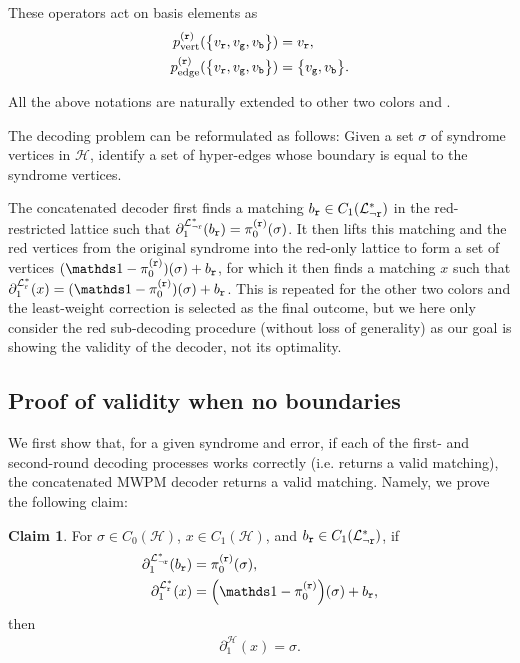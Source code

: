 \documentclass[a4paper,twocolumn,11pt,accepted=2025-01-21]{quantumarticle}
\theoremstyle{definition}
\theoremstyle{definition}
\theoremstyle{definition}
\newtheorem{claim}{Claim}
\begin{document}
These operators act on basis elements as
\begin{align*}
    p_{\mathrm{vert}}^{(\texttt{r})}(\qty{v_{\texttt{r}},v_{\texttt{g}},v_{\texttt{b}}}) &= v_{\texttt{r}}, \\
    p_{\mathrm{edge}}^{(\texttt{r})}(\qty{v_{\texttt{r}},v_{\texttt{g}},v_{\texttt{b}}}) &= \qty{v_{\texttt{g}},v_{\texttt{b}}}.
\end{align*}

All the above notations are naturally extended to other two colors \gbs and \bbs.

The decoding problem can be reformulated as follows: Given a set $\sigma$ of syndrome vertices in $\mathcal{H}$, identify a set of hyper-edges whose boundary is equal to the syndrome vertices.

The concatenated decoder first finds a matching $b_{\texttt{r}} \in C_1(\mathcal{L}_{\neg \texttt{r}}^*)$ in the red-restricted lattice such that $\partial_1^{\mathcal{L}^*_{\neg \texttt{r}}} (b_{\texttt{r}}) = \pi^{(\texttt{r})}_0(\sigma)$.
It then lifts this matching and the red vertices from the original syndrome into the red-only lattice to form a set of vertices $(\identity - \pi_0^{(\rbs)})(\sigma) + b_\rbs$, for which it then finds a matching $x$ such that $\partial_1^{\LatticeMono{\rbs}}(x) = (\identity - \pi_0^{(\rbs)})(\sigma) + b_\rbs$. This is repeated for the other two colors and the least-weight correction is selected as the final outcome, but we here only consider the red sub-decoding procedure (without loss of generality) as our goal is showing the validity of the decoder, not its optimality.

\subsection{Proof of validity when no boundaries}

We first show that, for a given syndrome and error, if each of the first- and second-round decoding processes works correctly (i.e. returns a valid matching), the concatenated MWPM decoder returns a valid matching.
Namely, we prove the following claim:

\begin{claim}
    For $\sigma \in C_0 (\mathcal{H})$, $x \in C_1 (\mathcal{H})$, and $b_{\texttt{r}} \in C_1(\mathcal{L}_{\neg \texttt{r}}^*)$, if
    \begin{subequations}
    \begin{align}
        \partial_1^{\LatticeRest{\rbs}}\qty(b_\rbs) &= \pi_0^{(\rbs)}(\sigma), \label{eq:validity_MWPM_step1} \\
        \partial_1^{\LatticeMono{\rbs}}(x) &= \qty(\identity - \pi_0^{(\rbs)})(\sigma) + b_\rbs, \label{eq:validity_MWPM_step2}
    \end{align}
    \label{eq:validity_MWPM}%
    \end{subequations}
    then 
    \begin{align}
        \partial_1^{\mathcal{H}}(x) = \sigma.
        \label{eq:validity_condition}
    \end{align}
\end{claim}
\end{document}
